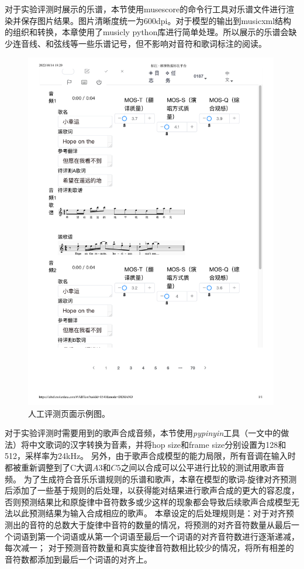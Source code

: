 对于实验评测时展示的乐谱，本节使用musescore的命令行工具对乐谱文件进行渲染并保存图片结果。图片清晰度统一为600dpi。对于模型的输出到musicxml结构的组织和转换，本章使用了musicly python库进行简单处理。所以展示的乐谱会缺少连音线、和弦线等一些乐谱记号，但不影响对音符和歌词标注的阅读。
\begin{figure}[ht]
  \includegraphics[width=0.99\textwidth]{figure/ast/MOS_eval_page.pdf}
  \caption{人工评测页面示例图。}
\end{figure}

对于实验评测时需要用到的歌声合成音频，本节使用\emph{pypinyin}工具（\citet{ren2020deepsinger}一文中的做法）将中文歌词的汉字转换为音素，并将hop size和frame size分别设置为128和512，采样率为24kHz。
另外，由于歌声合成模型的能力局限，所有音调在输入时都被重新调整到了C大调$A3$和$C5$之间以合成可以公平进行比较的测试用歌声音频。
为了生成符合音乐乐谱规则的乐谱和歌声，本章在模型的歌词-旋律对齐预测后添加了一些基于规则的后处理，以获得能对结果进行歌声合成的更大的容忍度，否则预测结果比和原旋律中音符数多或少这样的现象都会导致后续歌声合成模型无法以此预测结果为输入合成相应的歌声。
本章设定的后处理规则是：对于对齐预测出的音符的总数大于旋律中音符的数量的情况，将预测的对齐音符数量从最后一个词语到第一个词语或从第一个词语至最后一个词语的对齐音符数进行逐渐递减，每次减一；
对于预测音符数量和真实旋律音符数相比较少的情况，将所有相差的音符数都添加到最后一个词语的对齐上。
